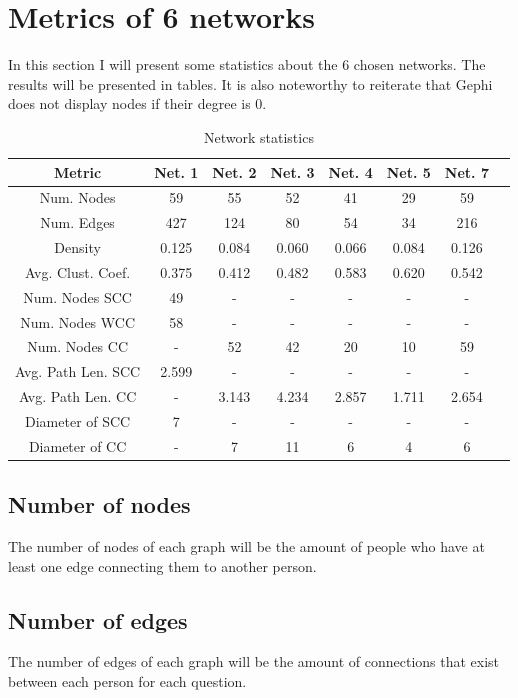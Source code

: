 \section{Metrics of 6 networks}
In this section I will present some statistics about the 6 chosen networks. The results will be presented in tables. It is also noteworthy to reiterate that Gephi does not display nodes if their degree is 0.

\begin{table}
    \centering
    \begin{tabular}{|c|c|c|c|c|c|c|c|}
        \hline
        \textbf{Metric} & \textbf{Net. 1} & \textbf{Net. 2} & \textbf{Net. 3} & \textbf{Net. 4} & \textbf{Net. 5} & \textbf{Net. 7} \\
        \hline
        Num. Nodes & 59 & 55 & 52 & 41 & 29 & 59 \\
        \hline
        Num. Edges & 427 & 124 & 80 & 54 & 34 & 216 \\
        \hline
        Density & 0.125 & 0.084 & 0.060 & 0.066 & 0.084 & 0.126 \\
        \hline
        Avg. Clust. Coef. & 0.375 & 0.412 & 0.482 & 0.583 & 0.620 & 0.542 \\
        \hline
        Num. Nodes SCC & 49 & - & - & - & - & - \\
        \hline
        Num. Nodes WCC & 58 & - & - & - & - & - \\
        \hline
        Num. Nodes CC & - & 52 & 42 & 20 & 10 & 59 \\
        \hline
        Avg. Path Len. SCC & 2.599 & - & - & - & - & - \\
        \hline
        Avg. Path Len. CC & - & 3.143 & 4.234 & 2.857 & 1.711 & 2.654 \\
        \hline
        Diameter of SCC & 7 & - & - & - & - & - \\
        \hline
        Diameter of CC & - & 7 & 11 & 6 & 4 & 6 \\
        \hline
    \end{tabular}
    \caption{Network statistics}
    \label{table:1}
\end{table}

\subsection{Number of nodes}
The number of nodes of each graph will be the amount of people who have at least one edge connecting them to another person.

\subsection{Number of edges}
The number of edges of each graph will be the amount of connections that exist between each person for each question.

